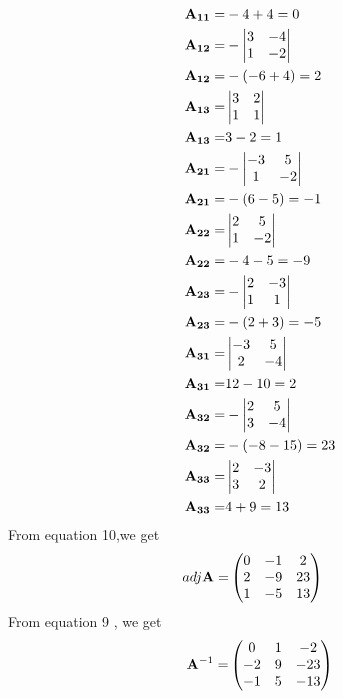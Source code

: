 \documentclass[two column]{article}
\begin{document}
\begin{enumerate}
\begin{align}
                      \mathbf{A_{11}}=&-4+4=0\\
                      \mathbf{A_{12}}=&-\begin{vmatrix}3 & -4\\ 1 & -2\end{vmatrix}\\
                      \mathbf{A_{12}}=&-(-6+4)=2\\
                      \mathbf{A_{13}}=&\begin{vmatrix} 3 & 2 \\1&1\end{vmatrix}\\
                      \mathbf{A_{13}}=&3-2=1\\
                      \mathbf{A_{21}}=&-\begin{vmatrix}-3 & 5 \\ 1 & -2\end{vmatrix}\\
                      \mathbf{A_{21}}=&-(6-5)=-1\\
                      \mathbf{A_{22}}=&\begin{vmatrix}2 & 5 \\1 & -2\end{vmatrix}\\
                      \mathbf{A_{22}}=&-4-5=-9\\
                      \mathbf{A_{23}}=&-\begin{vmatrix}2 & -3 \\ 1 & 1\end{vmatrix}\\
                      \mathbf{A_{23}}=&-(2+3)=-5\\
                      \mathbf{ A_{31}}=&\begin{vmatrix}-3 & 5\\2 & -4\end{vmatrix}\\
                      \mathbf{A_{31}}=&12-10=2\\
                      \mathbf{A_{32}}=&-\begin{vmatrix}2 & 5 \\ 3  &-4 \end{vmatrix}\\
                      \mathbf{A_{32}}=&-(-8-15)=23\\
                      \mathbf{A_{33}}=&\begin{vmatrix}2 & -3 \\ 3 & 2\end{vmatrix}\\
                      \mathbf{A_{33}}=&4+9=13\\
                  \end{align}
                    From equation 10,we get
                    \begin{align}
                    adj\mathbf{A}=&\begin{pmatrix}0 & -1 & 2\\ 2 & -9 & 23 \\ 1 & -5 & 13\end{pmatrix}
                    \end{align}
                    From equation 9 , we get
                    \begin{align}
                    \vec{A}^{-1}=&\myvec{0 & 1 & -2 \\ -2 & 9 &-23 \\ -1 & 5 & -13}\\

\end{align}
\end{enumerate}
\end{document}

